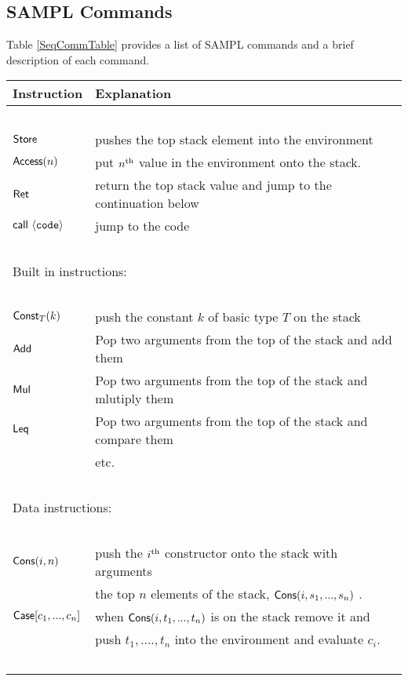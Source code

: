\documentclass[11pt]{article}
\newcommand{\<}{\langle}
\renewcommand{\>}{\rangle}
\begin{document}
\subsection {SAMPL Commands}
Table \ref {SeqCommTable} provides a list of SAMPL commands and a brief description of each command.
\begin{table}[!h]
\begin{center}
\begin{tabular}{|l|l|}
\hline
Instruction &Explanation \\ \hline
~ & ~\\
${\sf Store}$ &   pushes the top stack element into the environment \\
${\sf Access}(n)$    &   put $n^{\rm th}$ value in the environment onto the stack. \\ 
${\sf Ret} $     &       return the top stack value and jump to the continuation below \\ 
${\sf call}~\<{\tt code}\>$ & jump to the code \\
 ~ & ~ \\ \hline
\multicolumn{2}{|l|}{Built in instructions:} \\ \hline
~ & ~ \\ 
 ${\sf Const}_T(k)$       &    push the constant $k$ of basic type $T$ on the stack \\
${\sf Add}$ &             Pop two arguments from the top of the stack and add them \\ 
${\sf Mul}$ &             Pop two arguments from the top of the stack and mlutiply them \\ 
${\sf Leq}$  &            Pop two arguments from the top of the stack and compare them \\ ~ & etc. \\ 
~ & ~\\ \hline
\multicolumn{2}{|l|}{Data instructions:} \\ \hline
~ & ~ \\ 
 ${\sf Cons}(i,n)$       &    push the $i^{\rm th}$ constructor onto the stack with arguments \\
                                  & the top $n$ elements of the stack, ${\sf Cons}(i,s_1,...,s_n)$ . \\
 ${\sf Case}[c_1,...,c_n]$ &     when ${\sf Cons}(i,t_1,...,t_n)$  is on the stack remove it and \\
                                   & push $t_1, ...., t_n$ into the environment and evaluate $c_i$. \\ 
 ~ & ~ \\ \hline

\end{tabular}
\end{center}
\end{table}
\end{document}

